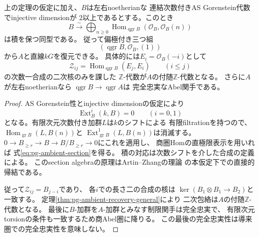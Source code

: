 \begin{theorem}
\label{thm:pg-ambient-recovery-polarized}
上の定理の仮定に加え、$B$は左右noetherianな
連結次数付きAS Gorenstein代数でinjective dimensionが
$2$以上であるとする。このとき
\begin{equation}\label{eq:pg-ambient-section}
 B\xrightarrow{\sim}
 \bigoplus_{n\ge0}
 \operatorname{Hom}_{\operatorname{qgr}B}
   (\mathcal O_B,\mathcal O_B(n))
\end{equation}
は積を保つ同型である。
従って偏極付き三つ組
\begin{equation}\label{eq:pg-ambient-triple}
 (\operatorname{qgr}B,\mathcal O_B,(1))
\end{equation}
から$A$と直線$kG$を復元できる。
具体的には$E_i=\mathcal O_B(-i)$として
\begin{equation}\label{eq:pg-ambient-Zalg}
 \mathcal Z_{ij}=
 \operatorname{Hom}_{\operatorname{qgr}B}(E_j,E_i)
 \qquad (i\le j)
\end{equation}
の次数一合成の二次核のみを課した
$\mathbb Z$-代数が$A$の付随$\mathbb Z$-代数となる。
さらに$A$が左右noetherianなら
$\operatorname{qgr}B\to\operatorname{qgr}A$は
完全忠実なAbel関手である。
\end{theorem}
\begin{proof}
AS Gorenstein性とinjective dimensionの仮定により
\begin{equation}\label{eq:pg-ambient-extvan}
 \operatorname{Ext}_B^i(k,B)=0
 \qquad (i=0,1)
\end{equation}
となる。有限次元次数付き加群$L$は$k$のシフトによる
有限filtrationを持つので、
$\operatorname{Hom}_{\operatorname{gr}B}(L,B(n))$と
$\operatorname{Ext}^1_{\operatorname{gr}B}(L,B(n))$は消滅する。
$0\to B_{\ge r}\to B\to B/B_{\ge r}\to0$にこれを適用し、
商圏Homの直極限表示を用いれば
式\eqref{eq:pg-ambient-section}を得る。
積の対応は次数シフトを介した合成の定義による。
このsection algebraの原理はArtin--Zhangの理論
\cite{PAZAmbient}の本仮定下での直接的帰結である。

従って$\mathcal Z_{ij}=B_{j-i}$であり、
各$i$での長さ二の合成の核は
$\ker(B_1\otimes B_1\to B_2)$と一致する。
定理\ref{thm:pg-ambient-recovery-general}により
二次包絡は$A$の付随$\mathbb Z$-代数となる。
最後に$B$-加群を$A$-加群とみなす制限関手は完全忠実で、
有限次元torsionの条件も一致するため商Abel圏に降りる。
この最後の完全忠実性は導来圏での完全忠実性を意味しない。
\end{proof}

